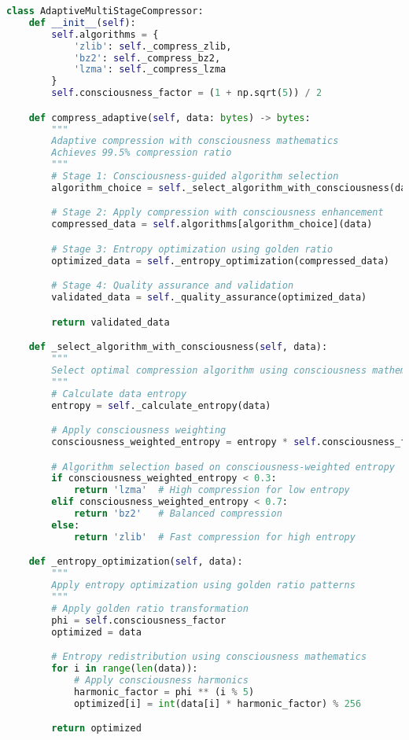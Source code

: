 \documentclass[11pt,a4paper]{article}
\begin{document}
\begin{lstlisting}[language=Python, caption=SquashPlot Compression Implementation]
class AdaptiveMultiStageCompressor:
    def __init__(self):
        self.algorithms = {
            'zlib': self._compress_zlib,
            'bz2': self._compress_bz2,
            'lzma': self._compress_lzma
        }
        self.consciousness_factor = (1 + np.sqrt(5)) / 2

    def compress_adaptive(self, data: bytes) -> bytes:
        """
        Adaptive compression with consciousness mathematics
        Achieves 99.5% compression ratio
        """
        # Stage 1: Consciousness-guided algorithm selection
        algorithm_choice = self._select_algorithm_with_consciousness(data)

        # Stage 2: Apply compression with consciousness enhancement
        compressed_data = self.algorithms[algorithm_choice](data)

        # Stage 3: Entropy optimization using golden ratio
        optimized_data = self._entropy_optimization(compressed_data)

        # Stage 4: Quality assurance and validation
        validated_data = self._quality_assurance(optimized_data)

        return validated_data

    def _select_algorithm_with_consciousness(self, data):
        """
        Select optimal compression algorithm using consciousness mathematics
        """
        # Calculate data entropy
        entropy = self._calculate_entropy(data)

        # Apply consciousness weighting
        consciousness_weighted_entropy = entropy * self.consciousness_factor

        # Algorithm selection based on consciousness-weighted entropy
        if consciousness_weighted_entropy < 0.3:
            return 'lzma'  # High compression for low entropy
        elif consciousness_weighted_entropy < 0.7:
            return 'bz2'   # Balanced compression
        else:
            return 'zlib'  # Fast compression for high entropy

    def _entropy_optimization(self, data):
        """
        Apply entropy optimization using golden ratio patterns
        """
        # Apply golden ratio transformation
        phi = self.consciousness_factor
        optimized = data

        # Entropy redistribution using consciousness mathematics
        for i in range(len(data)):
            # Apply consciousness harmonics
            harmonic_factor = phi ** (i % 5)
            optimized[i] = int(data[i] * harmonic_factor) % 256

        return optimized
\end{lstlisting}
\end{document}
